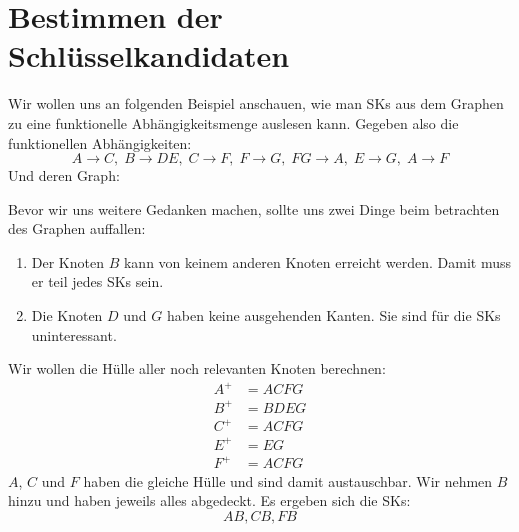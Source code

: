 \documentclass[a4paper, ngerman]{article}
\begin{document}
\section*{Bestimmen der Schlüsselkandidaten}
Wir wollen uns an folgenden Beispiel anschauen,
wie man SKs aus dem Graphen zu eine
funktionelle Abhängigkeitsmenge auslesen kann.
Gegeben also die funktionellen Abhängigkeiten:
$$
    A  \to C,\;
    B  \to DE,\;
    C  \to F,\;
    F  \to G,\;
    FG \to A,\;
    E  \to G,\;
    A  \to F
$$
Und deren Graph:
\begin{center}
\end{center}
Bevor wir uns weitere Gedanken machen,
sollte uns zwei Dinge beim betrachten des Graphen auffallen:
\begin{enumerate}
    \item Der Knoten $B$ kann von keinem anderen Knoten erreicht werden.
        Damit muss er teil jedes SKs sein.
    \item Die Knoten $D$ und $G$ haben keine ausgehenden Kanten.
        Sie sind für die SKs uninteressant.
\end{enumerate}
Wir wollen die Hülle aller noch relevanten Knoten berechnen:
\begin{align*}
    A^+ &= ACFG \\
    B^+ &= BDEG \\
    C^+ &= ACFG \\
    E^+ &= EG \\
    F^+ &= ACFG
\end{align*}
$A$, $C$ und $F$ haben die gleiche Hülle
und sind damit austauschbar.
Wir nehmen $B$ hinzu und haben
jeweils alles abgedeckt.
Es ergeben sich die SKs:
$$
    AB, CB, FB
$$
\end{document}
